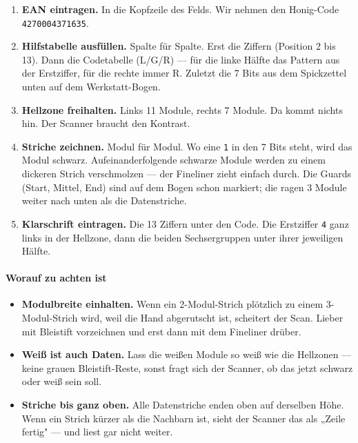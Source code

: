 \begin{enumerate}
\item \textbf{EAN eintragen.} In die Kopfzeile des Felds. Wir nehmen
  den Honig-Code \texttt{4270004371635}.

\item \textbf{Hilfstabelle ausfüllen.} Spalte für Spalte. Erst die
  Ziffern (Position 2 bis 13). Dann die Codetabelle (L/G/R) — für die
  linke Hälfte das Pattern aus der Erstziffer, für die rechte immer R.
  Zuletzt die 7 Bits aus dem Spickzettel unten auf dem Werkstatt-Bogen.

\item \textbf{Hellzone freihalten.} Links 11 Module, rechts 7 Module.
  Da kommt nichts hin. Der Scanner braucht den Kontrast.

\item \textbf{Striche zeichnen.} Modul für Modul. Wo eine \texttt{1}
  in den 7 Bits steht, wird das Modul schwarz. Aufeinanderfolgende
  schwarze Module werden zu einem dickeren Strich verschmolzen — der
  Fineliner zieht einfach durch. Die Guards (Start, Mittel, End) sind
  auf dem Bogen schon markiert; die ragen 3 Module weiter nach unten
  als die Datenstriche.

\item \textbf{Klarschrift eintragen.} Die 13 Ziffern unter den Code.
  Die Erstziffer \texttt{4} ganz links in der Hellzone, dann die
  beiden Sechsergruppen unter ihrer jeweiligen Hälfte.
\end{enumerate}

\paragraph{Worauf zu achten ist}
\begin{itemize}
\item \textbf{Modulbreite einhalten.} Wenn ein 2-Modul-Strich plötzlich
  zu einem 3-Modul-Strich wird, weil die Hand abgerutscht ist, scheitert
  der Scan. Lieber mit Bleistift vorzeichnen und erst dann mit dem
  Fineliner drüber.
\item \textbf{Weiß ist auch Daten.} Lass die weißen Module so weiß wie
  die Hellzonen — keine grauen Bleistift-Reste, sonst fragt sich der
  Scanner, ob das jetzt schwarz oder weiß sein soll.
\item \textbf{Striche bis ganz oben.} Alle Datenstriche enden oben auf
  derselben Höhe. Wenn ein Strich kürzer als die Nachbarn ist, sieht
  der Scanner das als „Zeile fertig" — und liest gar nicht weiter.
\end{itemize}

